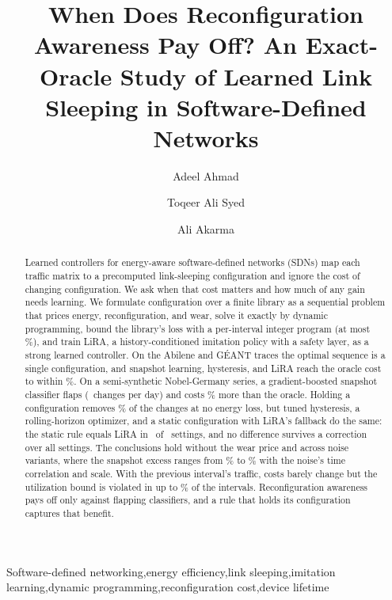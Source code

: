 \documentclass[5p,times]{elsarticle}
\begin{document}
\begin{frontmatter}
\title{When Does Reconfiguration Awareness Pay Off? An Exact-Oracle Study of Learned Link Sleeping in Software-Defined Networks}

\author[a]{Adeel Ahmad}
\author[a]{Toqeer Ali Syed}
\author[a,b]{Ali Akarma}

\begin{abstract}
Learned controllers for energy-aware software-defined networks (SDNs) map each traffic matrix to a precomputed link-sleeping configuration and ignore the cost of changing configuration. We ask when that cost matters and how much of any gain needs learning. We formulate configuration over a finite library as a sequential problem that prices energy, reconfiguration, and wear, solve it exactly by dynamic programming, bound the library's loss with a per-interval integer program (at most \boundMaxLoss\%), and train LiRA, a history-conditioned imitation policy with a safety layer, as a strong learned controller. On the Abilene and G\'{E}ANT traces the optimal sequence is a single configuration, and snapshot learning, hysteresis, and LiRA reach the oracle cost to within \realSpread\%. On a semi-synthetic Nobel-Germany series, a gradient-boosted snapshot classifier flaps (\nobBFourchg\ changes per day) and costs \nzMainExcess\% more than the oracle. Holding a configuration removes \nobY\% of the changes at no energy loss, but tuned hysteresis, a rolling-horizon optimizer, and a static configuration with LiRA's fallback do the same: the static rule equals LiRA in \staticSame\ of \staticTotal\ settings, and no difference survives a correction over all settings. The conclusions hold without the wear price and across noise variants, where the snapshot excess ranges from \nzhalfExcess\% to \nzarAExcess\% with the noise's time correlation and scale. With the previous interval's traffic, costs barely change but the utilization bound is violated in up to \staleNobViolMax\% of the intervals. Reconfiguration awareness pays off only against flapping classifiers, and a rule that holds its configuration captures that benefit.
\end{abstract}

\begin{keyword}
Software-defined networking\sep energy efficiency\sep link sleeping\sep imitation learning\sep dynamic programming\sep reconfiguration cost\sep device lifetime
\end{keyword}
\end{frontmatter}
\end{document}
